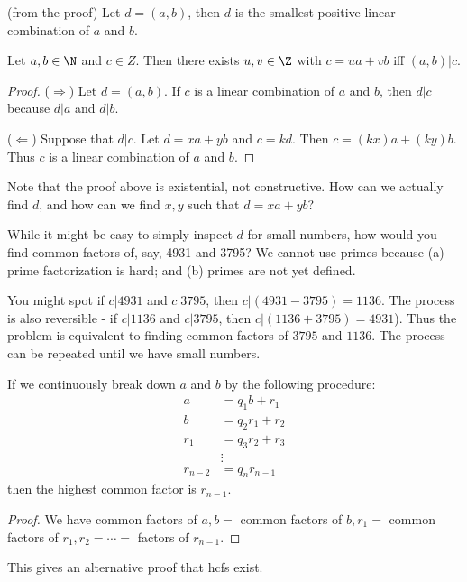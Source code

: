 \documentclass[a4paper]{article}
\begin{document}
  \begin{cor}
    (from the proof) Let $d  = (a, b)$, then $d$ is the smallest positive linear combination of $a$ and $b$.
  \end{cor}

  \begin{cor}
    Let $a, b\in\N$ and $c\in Z$. Then there exists $u, v\in \Z$  with $c=ua + vb$ iff $(a, b)|c$.
  \end{cor}

  \begin{proof}
    ($\Rightarrow$) Let $d=(a, b)$. If $c$ is a linear combination of $a$ and $b$, then $d|c$ because $d|a$ and $d|b$.

    ($\Leftarrow$) Suppose that $d|c$. Let $d = xa + yb$ and $c = kd$. Then $c = (kx)a + (ky)b$. Thus $c$ is a linear combination of $a$ and $b$.
  \end{proof}

  Note that the proof above is existential, not constructive. How can we actually find $d$, and how can we find $x, y$ such that $d = xa + yb$?

  While it might be easy to simply inspect $d$ for small numbers, how would you find common factors of, say, 4931 and 3795? We cannot use primes because (a) prime factorization is hard; and (b) primes are not yet defined.

  You might spot if $c|4931$ and $c|3795$, then $c|(4931 - 3795)=1136$. The process is also reversible - if $c|1136$ and $c|3795$, then $c|(1136 + 3795) = 4931$). Thus the problem is equivalent to finding common factors of $3795$ and $1136$. The process can be repeated until we have small numbers.

  \begin{prop}
    If we continuously break down $a$ and $b$ by the following procedure: 
    \begin{align*}
      a &= q_1b + r_1\\
      b &= q_2r_1 + r_2\\
      r_1 &= q_3r_2 + r_3\\
      &\vdots\\
      r_{n-2} &= q_nr_{n-1}
    \end{align*}
    then the highest common factor is $r_{n-1}$.
  \end{prop}

  \begin{proof}
    We have common factors of $a, b=$ common factors of $b, r_1=$ common factors of $r_1, r_2 = \cdots = $ factors of $r_{n-1}$.
  \end{proof}
  \note This gives an alternative proof that hcfs exist.
\end{document}
